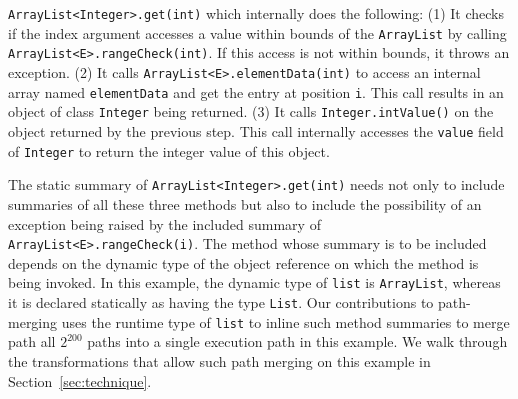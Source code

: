 {\tt ArrayList<Integer>.get(int)} which internally does the following:
%
(1) It checks if the index argument accesses a value within bounds of the {\tt ArrayList} by calling\\
{\tt ArrayList<E>.rangeCheck(int)}. If this access is not within bounds, it throws an exception.
%
(2) It calls {\tt ArrayList<E>.elementData(int)} to access an internal array named {\tt elementData} and get the
entry at position {\tt i}. This call results in an object of class {\tt Integer} being returned.
%
(3) It calls {\tt Integer.intValue()} on the object returned by the previous step. This call internally accesses
the {\tt value} field of {\tt Integer} to return the integer value of this object.
%

The static summary of {\tt ArrayList<Integer>.get(int)} needs not only to include summaries of all these three methods but
also to include the possibility of an exception being raised by the included summary of {\tt ArrayList<E>.rangeCheck(i)}.
%
The method whose summary is to be included depends on the dynamic type of the object reference on which the method is being invoked.
%
In this example, the dynamic type of {\tt list} is {\tt ArrayList}, whereas it is declared statically as having the type {\tt List}.
%
Our contributions to path-merging uses the runtime type of {\tt list} to inline such method summaries to
merge path all $2^{200}$ paths into a single execution path in this example.
%
We  walk through the transformations that allow such path merging on this example in Section~\ref{sec:technique}.